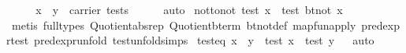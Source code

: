 \begin{isabellebody}
\ \ \isamarkupfalse%
\ \isamarkupfalse%
\ {}x\ {}\ y\ {}\ carrier\ tests{}\isanewline
\ \ \ \ \isamarkupfalse%
\ auto\isanewline
{}\isamarkupfalse%
%
\endisatagproof
{\isafoldproof}%
%
\isadelimproof
\isanewline
%
\endisadelimproof
\isanewline
{}\isamarkupfalse%
\ not{}to{}not{}\ {}{}{}test\ x{}\ {}\ test\ {}bt{}not\ x{}{}\isanewline
%
\isadelimproof
\ \ %
\endisadelimproof
%
\isatagproof
{}\isamarkupfalse%
\ {}metis\ {}full{}types{}\ Quotient{}{}abs{}rep\ Quotient{}{}bterm\ bt{}not{}def\ map{}fun{}apply\ pred{}expr{}test\ pred{}expr{}unfold\ test{}unfold{}simps{}{}{}{}%
\endisatagproof
{\isafoldproof}%
%
\isadelimproof
\isanewline
%
\endisadelimproof
\isanewline
{}\isamarkupfalse%
\ test{}eq{}\ {}x\ {}\ y\ {}\ test\ x\ {}\ test\ y{}%
\isadelimproof
\ %
\endisadelimproof
%
\isatagproof
{}\isamarkupfalse%
\ auto%
\endisatagproof
{\isafoldproof}%
%
\isadelimproof
%
\endisadelimproof
\isanewline
\isanewline

\end{isabellebody}
